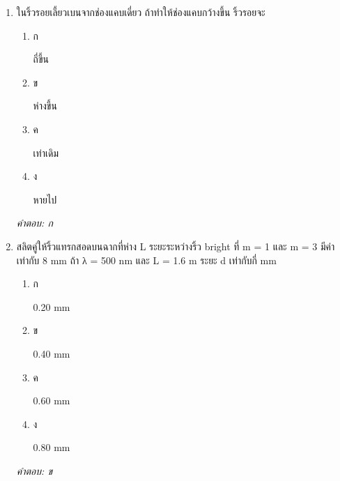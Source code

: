 \documentclass[12pt]{article}
\begin{document}
\begin{enumerate}[label=\arabic*., itemsep=0.5\baselineskip, topsep=0.5\baselineskip, leftmargin=*]
\item ในริ้วรอยเลี้ยวเบนจากช่องแคบเดี่ยว ถ้าทำให้ช่องแคบกว้างขึ้น ริ้วรอยจะ
\begin{enumerate}[label=\alph*)., itemsep=0.3\baselineskip, topsep=0.3\baselineskip]
\item ก\ 
\begin{minipage}[t]{0.9\linewidth}
\raggedright ถี่ขึ้น
\end{minipage}
\item ข\ 
\begin{minipage}[t]{0.9\linewidth}
\raggedright ห่างขึ้น
\end{minipage}
\item ค\ 
\begin{minipage}[t]{0.9\linewidth}
\raggedright เท่าเดิม
\end{minipage}
\item ง\ 
\begin{minipage}[t]{0.9\linewidth}
\raggedright หายไป
\end{minipage}
\end{enumerate}
\vspace{-0.3\baselineskip}
\begin{small}
\textit{คำตอบ: ก}
\end{small}

\item สลิตคู่ให้ริ้วแทรกสอดบนฉากที่ห่าง L ระยะระหว่างริ้ว bright ที่ m = 1 และ m = 3 มีค่าเท่ากับ 8 mm ถ้า λ = 500 nm และ L = 1.6 m ระยะ d เท่ากับกี่ mm
\begin{enumerate}[label=\alph*)., itemsep=0.3\baselineskip, topsep=0.3\baselineskip]
\item ก\ 
\begin{minipage}[t]{0.9\linewidth}
\raggedright 0.20 mm
\end{minipage}
\item ข\ 
\begin{minipage}[t]{0.9\linewidth}
\raggedright 0.40 mm
\end{minipage}
\item ค\ 
\begin{minipage}[t]{0.9\linewidth}
\raggedright 0.60 mm
\end{minipage}
\item ง\ 
\begin{minipage}[t]{0.9\linewidth}
\raggedright 0.80 mm
\end{minipage}
\end{enumerate}
\vspace{-0.3\baselineskip}
\begin{small}
\textit{คำตอบ: ข}
\end{small}


\end{enumerate}
\end{document}
